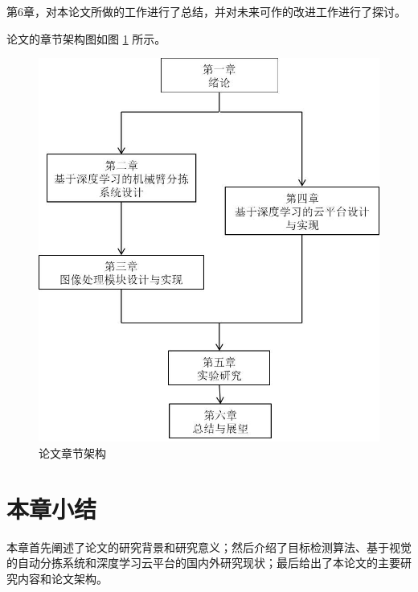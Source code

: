 第6章，对本论文所做的工作进行了总结，并对未来可作的改进工作进行了探讨。

论文的章节架构图如图    \ref{fig:paper_construct} 所示。

\begin{figure}
    \centering
    \includegraphics[scale=0.8]{pic/chap1/paper_construct.jpg}
    \caption{论文章节架构}
    \label{fig:paper_construct}
\end{figure}


\section{本章小结}
本章首先阐述了论文的研究背景和研究意义；然后介绍了目标检测算法、基于视觉的自动分拣系统和深度学习云平台的国内外研究现状；最后给出了本论文的主要研究内容和论文架构。